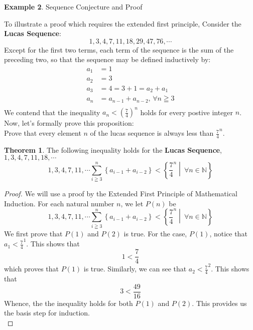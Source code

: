 \documentclass{book}
\theoremstyle{definition}
\newtheorem{theorem}{Theorem}[section]
\newtheorem{example}[theorem]{Example}
\begin{document}
\newpage
\begin{example}
Sequence Conjecture and Proof

To illustrate a proof which requires the extended first principle, Consider the \textbf{Lucas Sequence}:
    \begin{equation*}
        1, 3, 4, 7, 11, 18, 29, 47, 76, \cdots
    \end{equation*}
Except for the first two terms, each term of the sequence is the sum of the preceding two, so that the sequence may be defined inductively by:
    \begin{align*}
        a_1 & = 1 \\
        a_2 & = 3 \\
        a_3 & = 4 = 3 + 1 = a_2 + a_1 \\
        a_n & = a_{n-1} + a_{n-2} \text{, }\forall n \geqq 3 \\
    \end{align*}
We contend that the inequality $a_n < (\frac{7}{4})^n$ holds for every postive integer $n$. Now, let's formally prove this proposition: \\ 

Prove that every element $n$ of the lucas sequence is always less than ${\frac{7}{4}}^n$. 
\begin{tcolorbox}
    \begin{theorem}
        The following inequality holds for the \textbf{Lucas Sequence}, $1, 3, 4, 7, 11, 18, \cdots$
            \begin{equation*}
                1,3,4,7,11, \cdots \sum_{i \geqq 3}^{n}{ \left  \{ a_{i-1} + a_{i-2} \right \}}  < \left \{ \frac{7}{4}^{n} \middle |\ \forall n \in \mathbb{N} \right \}
            \end{equation*} 
    \end{theorem}
\end{tcolorbox}

\begin{proof}
        We will use a proof by the Extended First Principle of Mathematical Induction. For each natural number $n$, we let $P(n)$ be
            \begin{equation*}
                 1,3,4,7,11, \cdots \sum_{i \geqq 3}^{n}{ \left  \{ a_{i-1} + a_{i-2} \right \}}  < \left \{ \frac{7}{4}^{n} \middle |\ \forall n \in \mathbb{N} \right \}
            \end{equation*}
        We first prove that $P(1)$ and $P(2)$ is true. For the case, $P(1)$, notice that $a_1 < {\frac{7}{4}}^1$. This shows that   
            \begin{equation*}
                 1 < \frac{7}{4}
            \end{equation*}
        which proves that $P(1)$ is true. Similarly, we can see that $a_2 < {\frac{7}{4}}^2$. This shows that   
            \begin{equation*}
                 3 < \frac{49}{16}
            \end{equation*}
        Whence, the the inequality holds for both $P(1)$ and $P(2)$. This provides us the basis step for induction. \\ 
        

\end{proof}
\end{example}
\end{document}
